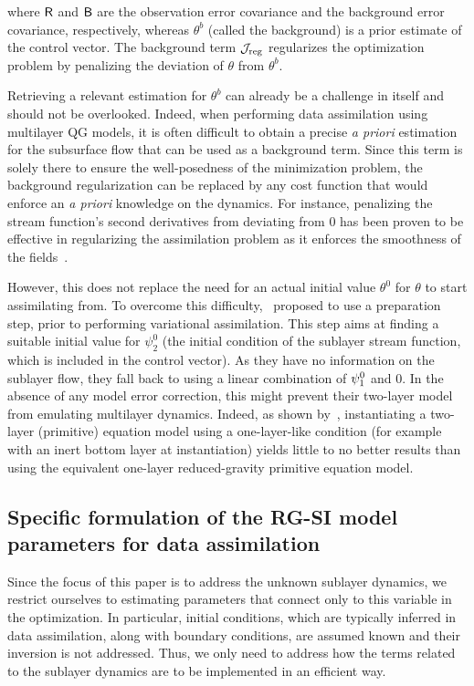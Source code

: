 \documentclass[
  draft
]{agujournal2025}
\begin{document}
where $\mat{R}$ and $\mat{B}$ are the observation error covariance and the background error covariance, respectively, whereas $\theta^b$ (called the background) is a prior estimate of the control vector. The background term $\loss{reg}$ regularizes the optimization problem by penalizing the deviation of $\theta$ from $\theta^b$.

Retrieving a relevant estimation for $\theta^b$ can already be a challenge in itself and should not be overlooked. Indeed, when performing data assimilation using multilayer QG models, it is often difficult to obtain a precise \textit{a priori} estimation for the subsurface flow that can be used as a background term. Since this term is solely there to ensure the well-posedness of the minimization problem, the background regularization can be replaced by any cost function that would enforce an \textit{a priori} knowledge on the dynamics. For instance, penalizing the stream function's second derivatives from deviating from 0 has been proven to be effective in regularizing the assimilation problem as it enforces the smoothness of the fields~\cite{vogeler1995,cong1995}.

However, this does not replace the need for an actual initial value $\theta^0$ for $\theta$ to start assimilating from. To overcome this difficulty,~ proposed to use a preparation step, prior to performing variational assimilation. This step aims at finding a suitable initial value for $\psi_2^0$ (the initial condition of the sublayer stream function, which is included in the control vector). As they have no information on the sublayer flow, they fall back to using a linear combination of $\sf_1^0$ and $0$. In the absence of any model error correction, this might prevent their two-layer model from emulating multilayer dynamics. Indeed, as shown by~, instantiating a two-layer (primitive) equation model using a one-layer-like condition (for example with an inert bottom layer at instantiation) yields little to no better results than using the equivalent one-layer reduced-gravity primitive equation model.

\subsection{Specific formulation of the RG-SI model parameters for data assimilation}\label{sec:forward-model}
Since the focus of this paper is to address the unknown sublayer dynamics, we restrict ourselves to estimating parameters that connect only to this variable in the optimization. 
In particular, initial conditions, which are typically inferred in data assimilation, along with boundary conditions, are assumed known and their inversion is not addressed. 
Thus, we only need to address how the terms related to the sublayer dynamics are to be implemented in an efficient way.
\end{document}
